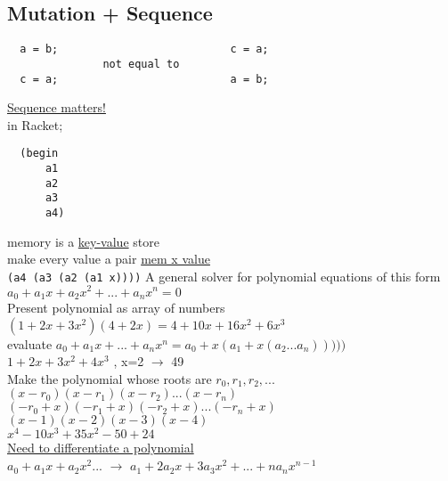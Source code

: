 \documentclass{article}
\begin{document}
\subsection*{Mutation + Sequence}
\begin{flushleft}
 \begin{verbatim}
  a = b;                           c = a;
               not equal to        
  c = a;                           a = b;
 \end{verbatim}
 \underline{Sequence matters!}\\
 \bigskip
 in Racket;\\
 \begin{verbatim}
  (begin
      a1
      a2
      a3
      a4)
 \end{verbatim}
 memory is a \underline{key-value} store\\
 make every value a pair \underline{mem x value}\\
 \verb|(a4 (a3 (a2 (a1 x))))|
 \bigskip
 A general solver for polynomial equations of this form\\
 $a_0 + a_1x + a_2x^2 + ... + a_nx^n = 0$\\
 Present polynomial as array of numbers\\
 $(1 + 2x + 3x^2) (4 + 2x) = 4 + 10x + 16x^2 + 6x^3$\\
 evaluate $a_0 + a_1x + ... + a_nx^n = a_0 + x(a_1 + x(a_2 ... a_n)))))$\\
 $1 + 2x + 3x^2 + 4x^3$  , x=2 $\rightarrow$ 49\\
 Make the polynomial whose roots are $r_0, r_1, r_2, ...$\\
 $(x - r_0) (x - r_1) (x - r_2) ... (x - r_n)$\\
 $(-r_0 + x) (-r_1 + x) (-r_2 + x) ... (-r_n + x)$\\
 $(x - 1) (x - 2) (x - 3) (x - 4)$\\
 $x^4 - 10x^3 + 35x^2 - 50 + 24$\\
 \underline{Need to differentiate a polynomial}\\
 $a_0 + a_1x + a_2x^2 ... $ $\rightarrow$ $a_1 + 2a_2x + 3a_3x^2 + ... + na_nx^{n-1}$
\end{flushleft}
\end{document}
